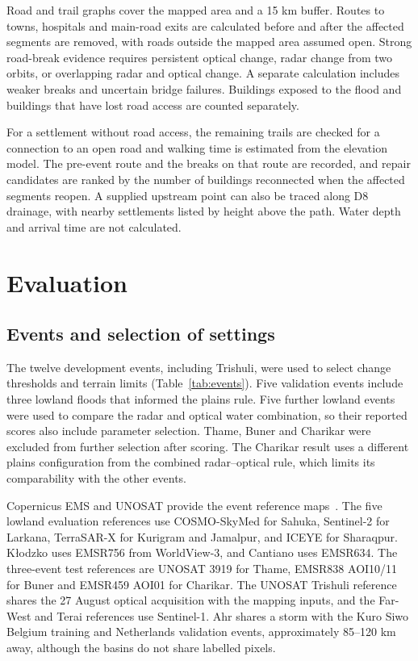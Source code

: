 \documentclass[10pt,twocolumn,letterpaper]{article}
\begin{document}
Road and trail graphs cover the mapped area and a 15 km buffer. Routes to towns, hospitals and
main-road exits are calculated before and after the affected segments are removed, with roads
outside the mapped area assumed open. Strong road-break evidence requires persistent optical change,
radar change from two orbits, or overlapping radar and optical change. A separate calculation
includes weaker breaks and uncertain bridge failures. Buildings exposed to the flood and buildings
that have lost road access are counted separately.

For a settlement without road access, the remaining trails are checked for a connection to an open
road and walking time is estimated from the elevation model. The pre-event route and the breaks on
that route are recorded, and repair candidates are ranked by the number of buildings reconnected
when the affected segments reopen. A supplied upstream point can also be traced along D8 drainage,
with nearby settlements listed by height above the path. Water depth and arrival time are not
calculated.

\section{Evaluation}
\subsection{Events and selection of settings}
The twelve development events, including Trishuli, were used to select change thresholds and terrain
limits (Table~\ref{tab:events}). Five validation events include three lowland floods that informed
the plains rule. Five further lowland events were used to compare the radar and optical water
combination, so their reported scores also include parameter selection. Thame, Buner and Charikar
were excluded from further selection after scoring. The Charikar result uses a different plains
configuration from the combined radar--optical rule, which limits its comparability with the other
events.




Copernicus EMS and UNOSAT provide the event reference maps~\cite{cems,unosat}. The five lowland
evaluation references use COSMO-SkyMed for Sahuka, Sentinel-2 for Larkana, TerraSAR-X for Kurigram and
Jamalpur, and ICEYE for Sharaqpur. K\l{}odzko uses EMSR756 from WorldView-3, and Cantiano uses
EMSR634. The three-event test references are UNOSAT 3919 for Thame, EMSR838 AOI10/11 for Buner and EMSR459
AOI01 for Charikar. The UNOSAT Trishuli reference shares the 27 August optical acquisition with the
mapping inputs, and the Far-West and Terai references use Sentinel-1. Ahr shares a storm with the
Kuro Siwo Belgium training and Netherlands validation events, approximately 85--120 km away,
although the basins do not share labelled pixels.
\end{document}
